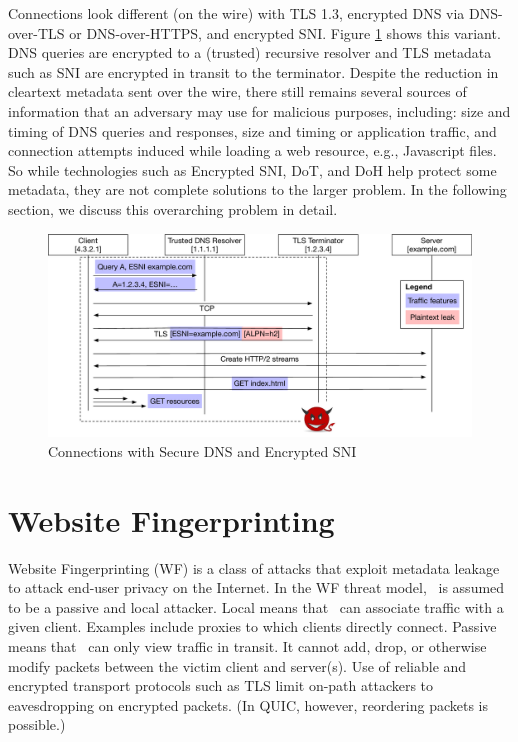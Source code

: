 \documentclass[runningheads]{llncs}
\begin{document}
Connections look different (on the wire) with TLS 1.3, encrypted DNS via DNS-over-TLS or
DNS-over-HTTPS, and encrypted SNI. Figure \ref{fig:connections-now} shows this variant.
DNS queries are encrypted to a (trusted) recursive resolver and TLS metadata such as SNI
are encrypted in transit to the terminator. Despite the reduction in cleartext metadata
sent over the wire, there still remains several sources of information that an adversary
may use for malicious purposes, including: size and timing of DNS queries and responses,
size and timing or application traffic, and connection attempts induced while loading a
web resource, e.g., Javascript files. So while technologies such as Encrypted SNI, DoT,
and DoH help protect some metadata, they are not complete solutions to the larger problem.
In the following section, we discuss this overarching problem in detail.

\begin{figure}
\includegraphics[scale=0.35]{figures/connection_flow_now}
\caption{Connections with Secure DNS and Encrypted SNI}
\label{fig:connections-now}
\end{figure}


\section{Website Fingerprinting}
Website Fingerprinting (WF) is a class of attacks that exploit metadata leakage to attack
end-user privacy on the Internet. In the WF threat model,
\adv\ is assumed to be a passive and local attacker. Local means that \adv\ can associate
traffic with a given client. Examples include proxies to which clients directly connect.
Passive means that \adv\ can only view traffic in transit. It cannot add, drop, or otherwise
modify packets between the victim client and server(s). Use of reliable and encrypted transport
protocols such as TLS limit on-path attackers to eavesdropping on encrypted packets. (In
QUIC, however, reordering packets is possible.)
\end{document}
